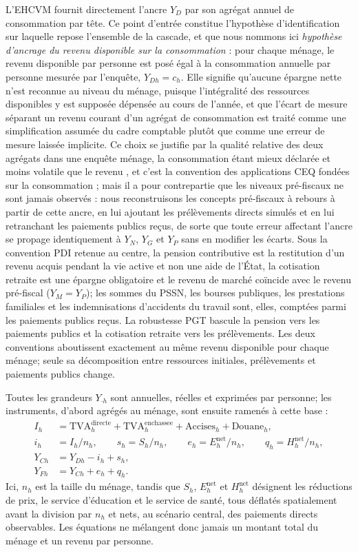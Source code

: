\documentclass[11pt,a4paper]{article}
\begin{document}
L'EHCVM fournit directement l'ancre $Y_D$ par son agrégat annuel de
consommation par tête. Ce point d'entrée constitue l'hypothèse d'identification
sur laquelle repose l'ensemble de la cascade, et que nous nommons ici
\emph{hypothèse d'ancrage du revenu disponible sur la consommation} : pour
chaque ménage, le revenu disponible par personne est posé égal à la
consommation annuelle par personne mesurée par l'enquête, $Y_{Dh}=c_h$. Elle
signifie qu'aucune épargne nette n'est reconnue au niveau du ménage, puisque
l'intégralité des ressources disponibles y est supposée dépensée au cours de
l'année, et que l'écart de mesure séparant un revenu courant d'un agrégat de
consommation est traité comme une simplification assumée du cadre comptable
plutôt que comme une erreur de mesure laissée implicite. Ce choix se justifie
par la qualité relative des deux agrégats dans une enquête ménage, la
consommation étant mieux déclarée et moins volatile que le revenu
\citep{deaton1997,deatonzaidi2002}, et c'est la convention des applications
CEQ fondées sur la consommation \citep{lustig2022}; mais il a pour contrepartie que les niveaux pré-fiscaux ne sont jamais observés : nous
reconstruisons les concepts pré-fiscaux à rebours à partir de cette ancre, en
lui ajoutant les prélèvements directs simulés et en lui retranchant les
paiements publics reçus, de sorte que toute erreur affectant l'ancre se propage
identiquement à $Y_N$, $Y_G$ et $Y_P$ sans en modifier les écarts.
Sous la convention PDI retenue au centre, la pension contributive est la
restitution d'un revenu acquis pendant la vie active et non une aide de l'État,
la cotisation retraite est une épargne obligatoire et le revenu de marché
coïncide avec le revenu pré-fiscal ($Y_M=Y_P$); les sommes du PSSN, les bourses
publiques, les prestations familiales et les indemnisations d'accidents du
travail sont, elles, comptées parmi les paiements publics reçus. La robustesse
PGT bascule la pension vers les paiements publics et la cotisation retraite vers
les prélèvements. Les deux conventions aboutissent exactement au même revenu
disponible pour chaque ménage; seule sa décomposition entre ressources
initiales, prélèvements et paiements publics change.

Toutes les grandeurs $Y_{\cdot h}$ sont annuelles, réelles et exprimées par
personne; les instruments, d'abord agrégés au ménage, sont ensuite ramenés à
cette base :
\begin{align}
I_h &= \mathrm{TVA}^{\mathrm{directe}}_h+
\mathrm{TVA}^{\mathrm{enchassee}}_h+\mathrm{Accises}_h+\mathrm{Douane}_h,\\
i_h&=I_h/n_h,\qquad s_h=S_h/n_h,\qquad e_h=E_h^{\mathrm{net}}/n_h,
\qquad q_h=H_h^{\mathrm{net}}/n_h,\\
Y_{Ch} &= Y_{Dh}-i_h+s_h,\\
Y_{Fh} &= Y_{Ch}+e_h+q_h.
\label{eq:yc-complet}
\end{align}
Ici, $n_h$ est la taille du ménage, tandis que $S_h$, $E_h^{\mathrm{net}}$ et
$H_h^{\mathrm{net}}$ désignent les réductions de prix, le service d'éducation et
le service de santé, tous déflatés spatialement avant la division par $n_h$ et
nets, au scénario central, des paiements directs observables. Les équations ne
mélangent donc jamais un montant total du ménage et un revenu par personne.
\end{document}
